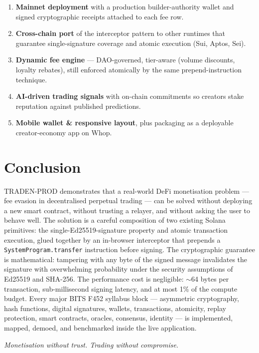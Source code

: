\documentclass[11pt,a4paper]{article}
\begin{document}
\begin{enumerate}
    \item \textbf{Mainnet deployment} with a production builder-authority wallet and signed cryptographic receipts attached to each fee row.
    \item \textbf{Cross-chain port} of the interceptor pattern to other runtimes that guarantee single-signature coverage and atomic execution (Sui, Aptos, Sei).
    \item \textbf{Dynamic fee engine} --- DAO-governed, tier-aware (volume discounts, loyalty rebates), still enforced atomically by the same prepend-instruction technique.
    \item \textbf{AI-driven trading signals} with on-chain commitments so creators stake reputation against published predictions.
    \item \textbf{Mobile wallet \& responsive layout}, plus packaging as a deployable creator-economy app on Whop.
\end{enumerate}

\section{Conclusion}

TRADEN-PROD demonstrates that a real-world DeFi monetisation problem --- fee evasion in decentralised perpetual trading --- can be solved without deploying a new smart contract, without trusting a relayer, and without asking the user to behave well. The solution is a careful composition of two existing Solana primitives: the single-Ed25519-signature property and atomic transaction execution, glued together by an in-browser interceptor that prepends a \texttt{SystemProgram.transfer} instruction before signing. The cryptographic guarantee is mathematical: tampering with any byte of the signed message invalidates the signature with overwhelming probability under the security assumptions of Ed25519 and SHA-256. The performance cost is negligible: $\sim$64 bytes per transaction, sub-millisecond signing latency, and at most 1\% of the compute budget. Every major BITS F452 syllabus block --- asymmetric cryptography, hash functions, digital signatures, wallets, transactions, atomicity, replay protection, smart contracts, oracles, consensus, identity --- is implemented, mapped, demoed, and benchmarked inside the live application.

\begin{center}
\textit{Monetisation without trust. Trading without compromise.}
\end{center}
\end{document}
